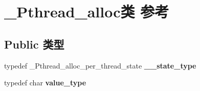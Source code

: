 \hypertarget{class___pthread__alloc}{}\section{\+\_\+\+Pthread\+\_\+alloc类 参考}
\label{class___pthread__alloc}
\subsection*{Public 类型}
\begin{DoxyCompactItemize}
\item 
\mbox{\label{class___pthread__alloc_a8edd4397e3aba466e67339059e42612d}} 
typedef \+\_\+\+Pthread\+\_\+alloc\+\_\+per\+\_\+thread\+\_\+state {\bfseries \+\_\+\+\_\+state\+\_\+type}
\item 
\mbox{\label{class___pthread__alloc_a1ad638c0d5ff672e9078128a214652d9}} 
typedef char {\bfseries value\+\_\+type}
\end{DoxyCompactItemize}
